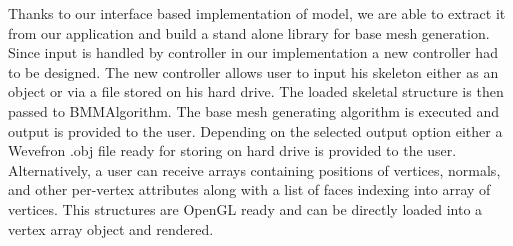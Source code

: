 Thanks to our interface based implementation of model, we are able to extract it from our application and build a stand alone library for base mesh generation.
Since input is handled by controller in our implementation a new controller had to be designed.
The new controller allows user to input his skeleton either as an object or via a file stored on his hard drive.
The loaded skeletal structure is then passed to BMMAlgorithm.
The base mesh generating algorithm is executed and output is provided to the user.
Depending on the selected output option either a Wevefron .obj file ready for storing on hard drive is provided to the user.
Alternatively, a user can receive arrays containing positions of vertices, normals, and other per-vertex attributes along with a list of faces indexing into array of vertices.
This structures are OpenGL ready and can be directly loaded into a vertex array object and rendered.